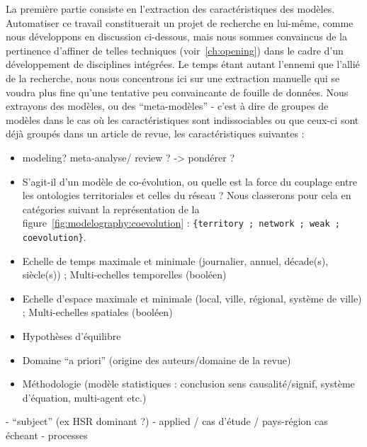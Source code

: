 La première partie consiste en l'extraction des caractéristiques des modèles. Automatiser ce travail constituerait un projet de recherche en lui-même, comme nous développons en discussion ci-dessous, mais nous sommes convaincus de la pertinence d'affiner de telles techniques (voir~\ref{ch:opening}) dans le cadre d'un développement de disciplines intégrées. Le temps étant autant l'ennemi que l'allié de la recherche, nous nous concentrons ici sur une extraction manuelle qui se voudra plus fine qu'une tentative peu convaincante de fouille de données. Nous extrayons des modèles, ou des ``meta-modèles'' - c'est à dire de groupes de modèles dans le cas où les caractéristiques sont indissociables ou que ceux-ci sont déjà groupés dans un article de revue, les caractéristiques suivantes :

\begin{itemize}
\item modeling? meta-analyse/ review ? -> pondérer ?
\item S'agit-il d'un modèle de co-évolution, ou quelle est la force du couplage entre les ontologies territoriales et celles du réseau ? Nous classerons pour cela en catégories suivant la représentation de la figure~\ref{fig:modelography:coevolution} : \texttt{\{territory ; network ; weak ; coevolution\}}.
\item Echelle de temps maximale et minimale (journalier, annuel, décade(s), siècle(s)) ; Multi-echelles temporelles (booléen)
\item Echelle d'espace maximale et minimale (local, ville, régional, système de ville) ; Multi-echelles spatiales (booléen)
\item Hypothèses d'équilibre
\item Domaine ``a priori'' (origine des auteurs/domaine de la revue)
\item Méthodologie (modèle statistiques : conclusion sens causalité/signif, système d'équation, multi-agent etc.)
\end{itemize}

- ``subject'' (ex HSR dominant ?)
- applied / cas d'étude / pays-région cas écheant
- processes



